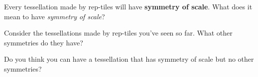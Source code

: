 \documentclass[nooutcomes]{ximera}
\begin{document}
\begin{problem}
Every tessellation made by rep-tiles will have \textbf{symmetry of scale}. What does it mean to have \textit{symmetry of scale}?
\vfill
\end{problem}

\begin{problem}
Consider the tessellations made by rep-tiles you've seen so far. What
other symmetries do they have?
\vfill
\end{problem}

\begin{problem}
Do you think you can have a tessellation that has symmetry of scale
but no other symmetries?
\vfill
\end{problem}
\end{document}

